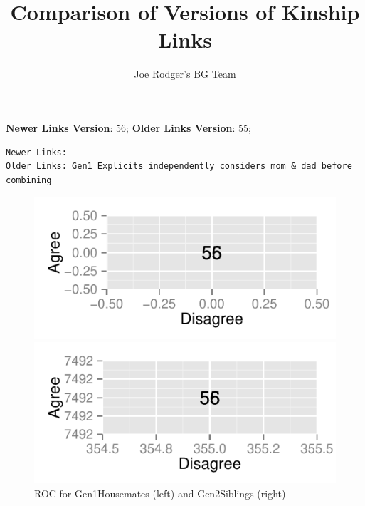 \documentclass[a4paper]{article}\usepackage{graphicx, color}
\title{Comparison of Versions of Kinship Links}
\author{Joe Rodger's BG Team}
\makeatletter
\def\maxwidth{ %
  \ifdim\Gin@nat@width>\linewidth
    \linewidth
  \else
    \Gin@nat@width
  \fi
}
\newenvironment{kframe}{%
 \def\at@end@of@kframe{}%
 \ifinner\ifhmode%
  \def\at@end@of@kframe{\end{minipage}}%
  \begin{minipage}{\columnwidth}%
 \fi\fi%
 \def\FrameCommand##1{\hskip\@totalleftmargin \hskip-\fboxsep
 \colorbox{shadecolor}{##1}\hskip-\fboxsep
     \hskip-\linewidth \hskip-\@totalleftmargin \hskip\columnwidth}%
 \MakeFramed {\advance\hsize-\width
   \@totalleftmargin\z@ \linewidth\hsize
   \@setminipage}}%
 {\par\unskip\endMakeFramed%
 \at@end@of@kframe}
\newenvironment{knitrout}{}{} %
\makeatother
\begin{document}
\maketitle

\setlength{\parindent}{0pt}%







\textbf{Newer Links Version}: 56;
\textbf{Older Links Version}: 55;

\begin{knitrout}
\color{fgcolor}\begin{kframe}
\begin{verbatim}
Newer Links:
Older Links: Gen1 Explicits independently considers mom & dad before combining
\end{verbatim}
\end{kframe}
\end{knitrout}


\begin{figure}[htbp]
\begin{knitrout}
\color{fgcolor}
\includegraphics[width=\maxwidth]{figure/unnamed-chunk-31} 

\includegraphics[width=\maxwidth]{figure/unnamed-chunk-32} 

\end{knitrout}

\caption{ROC for Gen1Housemates (left) and Gen2Siblings (right)}
\end{figure}
\end{document}
